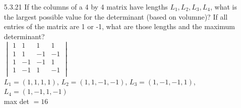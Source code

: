 \documentclass[10pt,twoside,reqno]{article}
\begin{document}
\begin{enumerate}
\vspace{3mm}
\item[5.3.21] If the columns of a 4 by 4 matrix have lengths $L_1, L_2, L_3, L_4$, what is the largest possible value for the determinant (based on volumne)? If all entries of the matrix are 1 or -1, what are those lengths and the maximum determinant?\\
\vspace{3mm}
$
$$
\begin{vmatrix}
1&1&1&1\\
1&1&-1&-1\\
1&-1&-1&1\\
1&-1&1&-1\\
\end{vmatrix}
$$
$\\
\vspace{2mm}
$L_1 = (1, 1, 1, 1)$, $L_2 = (1, 1, -1, -1)$, $L_3 = (1, -1, -1, 1)$, $L_4 = (1, -1, 1, -1)$\\
max det $= 16$\\


\end{enumerate}
\end{document}
